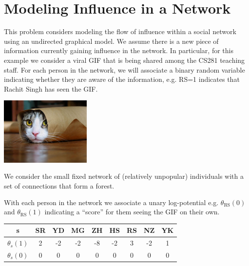 \documentclass[10pt]{harvardml}
\theoremstyle{plain}
\begin{document}
\section*{Modeling Influence in a Network}

This problem considers modeling the flow of influence within a social
network using an undirected graphical model. We assume there is a new
piece of information currently gaining influence in the network. In
particular, for this example we consider a viral GIF that is being
shared among the CS281 teaching staff. For each person in the network,
we will associate a binary random variable indicating whether they are
aware of the information, e.g. RS=1 indicates that Rachit Singh has seen the GIF.
  \begin{center}
    \includegraphics[width=4.5cm]{cat}
  \end{center}
\noindent We consider the small fixed network of (relatively unpopular) individuals with a set of connections that
  form a forest.

  \vspace{0.25cm}
  \begin{center}
 \end{center}
\noindent With each person in the network we associate a unary log-potential e.g. $\theta_{\text{RS}}(0)$ and $\theta_{\text{RS}}(1)$  indicating a ``score'' for them seeing the GIF on their own.

 \begin{center}
   \begin{tabular}{ccccccccc}
     \toprule
     s & SR & YD & MG & ZH & HS & RS & NZ & YK \\
     \midrule
     $\theta_s(1)$ & 2 & -2 & -2 & -8 & -2 & 3 & -2 & 1 \\
     $\theta_s(0)$ & 0 & 0 & 0 & 0 & 0 & 0 & 0 & 0 \\
     \bottomrule
   \end{tabular}
 \end{center}
\end{document}
